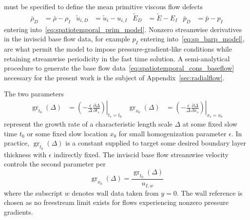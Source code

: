 must be specified to define the mean primitive viscous flow defects
\begin{align}
    \bar{\rho}_D &= \bar{\rho} - \rho_I
&   \tilde{u}_{i,D} &= \tilde{u}_i - u_{i,I}
&   \tilde{E}_D &= \tilde{E} - E_I
&   \bar{p}_D &= \bar{p} - p_I
\end{align}
entering into~\eqref{eq:spatiotemporal_prim_model}.  Nonzero streamwise
derivatives in the inviscid base flow data, for example $p_I$ entering
into~\eqref{eq:sp_barp_model}, are what permit the model to impose
pressure-gradient-like conditions while retaining streamwise periodicity in the
fast time solution.  A semi-analytical procedure to generate the base flow
data~\eqref{eq:spatiotemporal_cons_baseflow} necessary for the present work
is the subject of Appendix~\ref{sec:radialflow}.

The two parameters
\begin{align}
    \operatorname{gr}_{t_0}\!\left(\Delta\right) &= \left.\left(
        -\frac{\epsilon}{\Delta} \frac{\partial\!\Delta}{\partial\!t_s}
    \right)\right|_{t_s = t_0}
    &
    \operatorname{gr}_{x_0}\!\left(\Delta\right) &= \left.\left(
        -\frac{\epsilon}{\Delta} \frac{\partial\!\Delta}{\partial\!x_s}
    \right)\right|_{x_s = x_0}
\end{align}
represent the growth rate of a characteristic length scale $\Delta$ at some
fixed slow time $t_0$ or some fixed slow location $x_0$ for small homogenization
parameter $\epsilon$.  In practice,
$\operatorname{gr}_{t_0}\!\left(\Delta\right)$ is a constant supplied to target
some desired boundary layer thickness with $\epsilon$ indirectly fixed.
The inviscid base flow streamwise velocity controls the second parameter per
\begin{equation}
    \operatorname{gr}_{x_0}\!\left(\Delta\right)
    =
    \frac{\operatorname{gr}_{t_0}\!\left(\Delta\right)}
         {u_{I,w}}
\end{equation}
where the subscript $w$ denotes wall data taken from $y=0$.  The wall reference
is chosen as no freestream limit exists for flows experiencing nonzero pressure
gradients.

